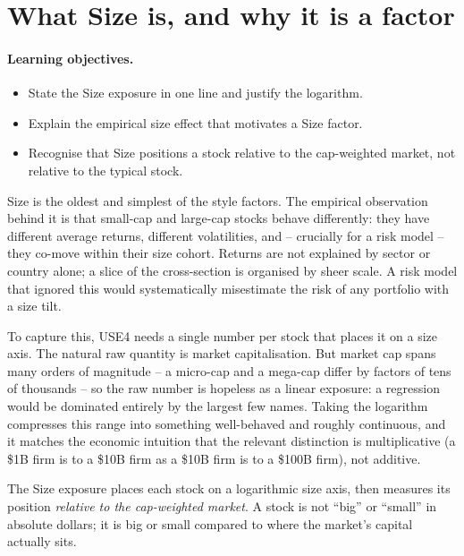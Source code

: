 \documentclass[11pt]{article}
\theoremstyle{definition}
\theoremstyle{plain}
\theoremstyle{remark}
\begin{document}
\tableofcontents
\bigskip

\section{What Size is, and why it is a factor}\label{sec:what}

\paragraph{Learning objectives.}
\begin{itemize}[leftmargin=1.4em,topsep=2pt,itemsep=1pt]
  \item State the Size exposure in one line and justify the logarithm.
  \item Explain the empirical size effect that motivates a Size factor.
  \item Recognise that Size positions a stock relative to the cap-weighted market, not relative to the typical stock.
\end{itemize}

Size is the oldest and simplest of the style factors. The empirical observation behind it is that small-cap and large-cap stocks behave differently: they have different average returns, different volatilities, and -- crucially for a risk model -- they co-move within their size cohort. Returns are not explained by sector or country alone; a slice of the cross-section is organised by sheer scale. A risk model that ignored this would systematically misestimate the risk of any portfolio with a size tilt.

To capture this, USE4 needs a single number per stock that places it on a size axis. The natural raw quantity is market capitalisation. But market cap spans many orders of magnitude -- a micro-cap and a mega-cap differ by factors of tens of thousands -- so the raw number is hopeless as a linear exposure: a regression would be dominated entirely by the largest few names. Taking the logarithm compresses this range into something well-behaved and roughly continuous, and it matches the economic intuition that the relevant distinction is multiplicative (a \$1B firm is to a \$10B firm as a \$10B firm is to a \$100B firm), not additive.

\begin{intuition}
The Size exposure places each stock on a logarithmic size axis, then measures its position \emph{relative to the cap-weighted market}. A stock is not ``big'' or ``small'' in absolute dollars; it is big or small compared to where the market's capital actually sits.
\end{intuition}
\end{document}
